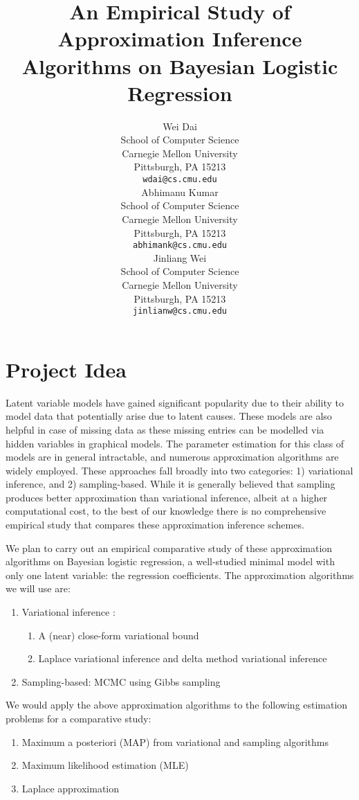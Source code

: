\documentclass[a4paper, 10pt]{article}
\title{An Empirical Study of Approximation Inference Algorithms on Bayesian Logistic Regression}
\author{
Wei Dai \\
School of Computer Science \\
Carnegie Mellon University\\
Pittsburgh, PA 15213\\
\texttt{wdai@cs.cmu.edu}\\
\And
Abhimanu Kumar \\
School of Computer Science \\
Carnegie Mellon University\\
Pittsburgh, PA 15213\\
\texttt{abhimank@cs.cmu.edu}\\
\And
Jinliang Wei \\
School of Computer Science \\
Carnegie Mellon University\\
Pittsburgh, PA 15213\\
\texttt{jinlianw@cs.cmu.edu}\\
}
\begin{document}
\maketitle

\setcounter{page}{1}
\vspace{-20pt}
\section{Project Idea}
\vspace{-5pt}
Latent variable models have gained significant popularity due to their ability to model data that potentially arise due to latent causes. These models are also helpful in case of missing data as these missing entries can be modelled via hidden variables in graphical models. The parameter estimation for this class of models are in general intractable, and numerous approximation algorithms are widely employed. These approaches fall broadly into two categories: 1) variational inference, and 2) sampling-based. While it is generally believed that sampling produces better approximation than variational inference, albeit at a higher computational cost, to the best of our knowledge there is no comprehensive empirical study that compares these approximation inference schemes.

We plan to carry out an empirical comparative study of these approximation algorithms on Bayesian logistic regression, a well-studied minimal model with only one latent variable: the regression coefficients. The approximation algorithms we will use are:
\vspace{-5pt}
\begin{enumerate}
  \item Variational inference \cite{RePEc:bes:jnlasa:v:105:i:489:y:2010:p:324-335}:
    \begin{enumerate}
      \item A (near) close-form variational bound \cite{Jaakkola96avariational}
      \item Laplace variational inference and delta method variational inference \cite{2012arXiv1209.4360W}
    \end{enumerate}
    \item Sampling-based: MCMC using Gibbs sampling
\end{enumerate}
\vspace{-5pt}
We would apply the above approximation algorithms to the following estimation problems for a comparative study:
\vspace{-5pt}
\begin{enumerate}
  \item Maximum a posteriori (MAP) from variational and sampling algorithms
  \item Maximum likelihood estimation (MLE)
  \item Laplace approximation
\end{enumerate}
\vspace{-5pt}
\end{document}
